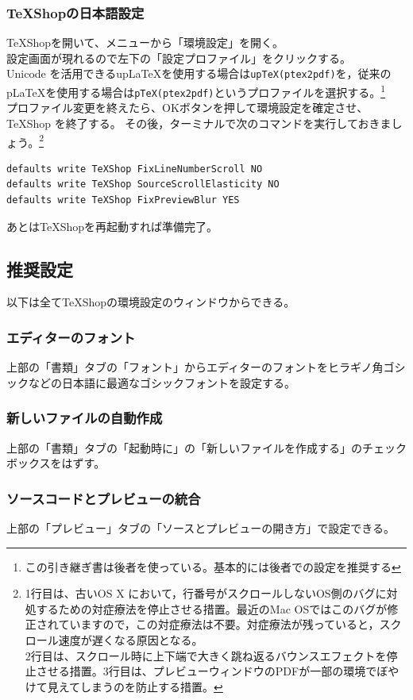 \documentclass[a4paper]{ltjsreport}
\begin{document}
\subsubsection{TeXShopの日本語設定}
TeXShopを開いて、メニューから「環境設定」を開く。\\
設定画面が現れるので左下の「設定プロファイル」をクリックする。\\
Unicode を活用できるup\LaTeX を使用する場合は\texttt{upTeX(ptex2pdf)}を，従来の p\LaTeX を使用する場合は\texttt{pTeX(ptex2pdf)}というプロファイルを選択する。\footnote{この引き継ぎ書は後者を使っている。基本的には後者での設定を推奨する}\\
プロファイル変更を終えたら、OKボタンを押して環境設定を確定させ、TeXShop を終了する。
その後，ターミナルで次のコマンドを実行しておきましょう。\footnote{1行目は、古いOS X において，行番号がスクロールしないOS側のバグに対処するための対症療法を停止させる措置。最近のMac OSではこのバグが修正されていますので，この対症療法は不要。対症療法が残っていると，スクロール速度が遅くなる原因となる。\\2行目は、スクロール時に上下端で大きく跳ね返るバウンスエフェクトを停止させる措置。3行目は、プレビューウィンドウのPDFが一部の環境でぼやけて見えてしまうのを防止する措置。}
\begin{lstlisting}
defaults write TeXShop FixLineNumberScroll NO
defaults write TeXShop SourceScrollElasticity NO
defaults write TeXShop FixPreviewBlur YES
  \end{lstlisting}
あとはTeXShopを再起動すれば準備完了。
\subsection{推奨設定}
以下は全てTeXShopの環境設定のウィンドウからできる。
\subsubsection{エディターのフォント}
上部の「書類」タブの「フォント」からエディターのフォントをヒラギノ角ゴシックなどの日本語に最適なゴシックフォントを設定する。
\subsubsection{新しいファイルの自動作成}
上部の「書類」タブの「起動時に」の「新しいファイルを作成する」のチェックボックスをはずす。
\subsubsection{ソースコードとプレビューの統合}
上部の「プレビュー」タブの「ソースとプレビューの開き方」で設定できる。
\end{document}
